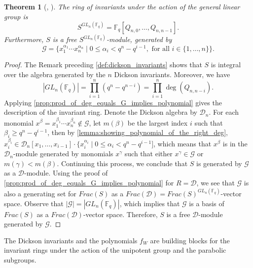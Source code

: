 \documentclass[12pt,a4paper]{report}
\newtheorem{theorem}{Theorem}[chapter]
\theoremstyle{definition}
\theoremstyle{remark}
\theoremstyle{definition}
\begin{document}
\begin{theorem}[{\cite{dickson_fundamental_1911}, \cite[Theorem B]{steinberg_dicksons_1987}}]\label{thm:dickson}
    The ring of invariants under the action of the general linear group is
    \begin{equation*}
        S^{GL_n(\mathbb{F}_q)} = \mathbb{F}_q[Q_{n, 0}, \ldots, Q_{n, n-1}].
    \end{equation*}
    Furthermore, $S$ is a free $S^{GL_n(\mathbb{F}_q)}$-module, generated by 
    \begin{equation*}
       \mathcal{G}= \{x_1^{\alpha_1}\cdots x_n^{\alpha_n}\mid 0\leq \alpha_i< q^n - q^{i-1}, \text{ for all } i\in \{1, \ldots, n\}\}.
    \end{equation*}
\end{theorem}
\begin{proof}
    The Remark preceding \cref{def:dickson_invariants} shows that $S$ is integral over the algebra generated by the $n$ Dickson invariants. Moreover, we have
    \begin{equation*}
        |GL_n(\mathbb{F}_q)| = \prod\limits_{i=1}^{n}(q^n - q^{n-i}) =\prod\limits_{i=1}^{n}\deg(Q_{n, n-i}). 
    \end{equation*}
    Applying \cref{prop:prod_of_deg_equals_G_implies_polynomial} gives the description of the invariant ring.\smallbreak
    Denote the Dickson algebra by $\mathcal{D}_n$. For each monomial $x^{\beta} = x_1^{\beta_1}\cdots x_n^{\beta_n}\notin \mathcal{G}$, let $m(\beta)$ be the largest index $i$ such that $\beta_i \geq q^n - q^{i-1}$, then by \cref{lemma:showing_polynomial_of_the_right_deg}, $x_i^{\beta_i} \in \mathcal{D}_n[x_1, \ldots, x_{i-1}]\cdot \{x_i^{\alpha_i}\mid 0\leq \alpha_i < q^n - q^{i-1}]$, which means that $x^{\beta}$ is in the $\mathcal{D}_n$-module generated by monomials $x^{\gamma}$ such that either $x^{\gamma}\in \mathcal{G}$ or $m(\gamma)<m(\beta)$. Continuing this process, we conclude that $S$ is generated by $\mathcal{G}$ as a $\mathcal{D}$-module. Using the proof of \cref{prop:prod_of_deg_equals_G_implies_polynomial} for $R = \mathcal{D}$, we see that $\mathcal{G}$ is also a generating set for $Frac(S)$ as a $Frac(\mathcal{D}) = Frac(S)^{GL_n(\mathbb{F}_q)}$-vector space. Observe that $|\mathcal{G}| = |GL_n(\mathbb{F}_q)|$, which implies that $\mathcal{G}$ is a basis of $Frac(S)$ as a $Frac(\mathcal{D})$-vector space. Therefore, $S$ is a free $\mathcal{D}$-module generated by $\mathcal{G}$.
\end{proof}
The Dickson invariants and the polynomials $f_W$ are building blocks for the invariant rings under the action of the unipotent group and the parabolic subgroups.
\end{document}
